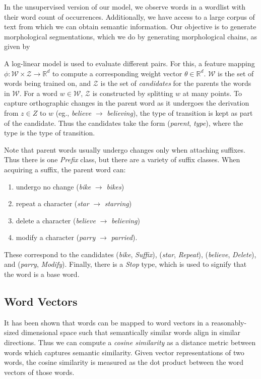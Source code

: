 \documentclass[11pt,twocolumn]{article}
\begin{document}
In the unsupervised version of our model, we observe words in a wordlist with their word count of occurrences. Additionally, we have access to a large corpus of text from which we can obtain semantic information. Our objective is to generate morphological segmentations, which we do by generating morphological chains, as given by \citeauthor{Narasimhan15}

A log-linear model is used to evaluate different pairs. For this, a feature mapping $\phi: \mathcal W \times \mathcal Z \rightarrow \mathbb R^d$ to compute a corresponding weight vector $\theta\in\mathbb R^d$. $\mathcal W$ is the set of words being trained on, and $\mathcal Z$ is the set of \emph{candidates} for the parents the words in $\mathcal W$. For a word $w\in\mathcal W$, $\mathcal Z$ is constructed by splitting $w$ at many points. To capture orthographic changes in the parent word as it undergoes the derivation from $z\in Z$ to $w$ (eg., \emph{believe} $\rightarrow$ \emph{believing}), the type of transition is kept as part of the candidate. Thus the candidates take the form (\emph{parent}, \emph{type}), where the type is the type of transition.

Note that parent words usually undergo changes only when attaching suffixes. Thus there is one \emph{Prefix} class, but there are a variety of suffix classes. When acquiring a suffix, the parent word can:
\begin{enumerate}
    \item undergo no change (\emph{bike} $\rightarrow$ \emph{bikes})
    \item repeat a character (\emph{star} $\rightarrow$ \emph{starring})
    \item delete a character (\emph{believe} $\rightarrow$ \emph{believing})
    \item modify a character (\emph{parry} $\rightarrow$ \emph{parried}).
\end{enumerate}
These correspond to the candidates (\emph{bike}, \emph{Suffix}), (\emph{star}, \emph{Repeat}), (\emph{believe}, \emph{Delete}), and (\emph{parry}, \emph{Modify}). Finally, there is a \emph{Stop} type, which is used to signify that the word is a base word.

\subsection{Word Vectors}

It has been shown that words can be mapped to word vectors in a reasonably-sized dimensional space such that semantically similar words align in similar directions. Thus we can compute a \emph{cosine similarity} as a distance metric between words which captures semantic similarity. Given vector representations of two words, the cosine similarity is measured as the dot product between the word vectors of those words.
\end{document}
